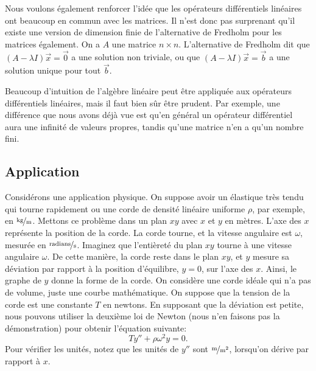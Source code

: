 Nous voulons également renforcer l'idée que les opérateurs différentiels linéaires ont beaucoup en commun avec les matrices. Il n'est donc pas surprenant qu'il existe une version de dimension finie de l'alternative de Fredholm pour les matrices  également.  On a $A$ une matrice $n \times n$. L'alternative de Fredholm dit que $(A-\lambda I) \vec{x} = \vec{0}$ a une solution non triviale, ou que $(A-\lambda I) \vec{x} = \vec{b}$ a une solution unique pour tout $\vec{b}$.

Beaucoup d'intuition de l'algèbre linéaire peut être appliquée aux opérateurs différentiels linéaires, mais il faut bien sûr être prudent. Par exemple, une différence que nous avons déjà vue est qu'en général un opérateur différentiel
aura une infinité de valeurs propres, tandis qu'une matrice n'en a qu'un nombre fini.


\subsection{Application}

Considérons une application physique. On suppose avoir un élastique très tendu qui tourne rapidement ou une corde de densité linéaire uniforme $\rho$, par exemple, en
$\unitfrac{kg}{m}$.
Mettons ce problème dans un plan $xy$ avec $x$ et $y$ en mètres. L'axe des $x$ représente la position de la corde. La corde tourne, et la vitesse angulaire est $\omega$, mesurée en $\unitfrac{radians}{s}$.
Imaginez que l'entièreté du plan $xy$ tourne à une vitesse angulaire  $\omega$.
De cette manière, la corde reste dans le plan $xy$, et $y$ mesure sa déviation par rapport à la position d'équilibre, $y=0$, sur l'axe des $x$.
Ainsi, le graphe de $y$ donne la forme de la corde.
On considère une corde idéale qui n'a pas de volume, juste une courbe mathématique. On suppose que la tension de la corde est une constante $T$ en newtons.
En supposant que la déviation est petite, nous pouvons utiliser la deuxième loi de Newton (nous n'en faisons pas la démonstration) pour obtenir l'équation suivante: 
\begin{equation*}
T y'' + \rho \omega^2 y = 0 .
\end{equation*}
Pour vérifier les unités, notez que les unités de $y''$ sont $\unitfrac{m}{m^2}$, lorsqu'on dérive par rapport à $x$.

